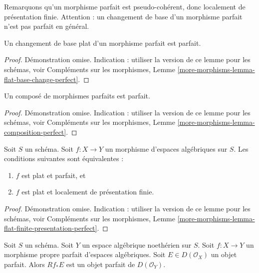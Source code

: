 \noindent
Remarquons qu'un morphisme parfait est pseudo-cohérent, donc localement de
présentation finie. Attention : un changement de base d'un morphisme parfait n'est pas parfait
en général.

\begin{lemma}
\label{lemma-flat-base-change-perfect}
Un changement de base plat d'un morphisme parfait est parfait.
\end{lemma}

\begin{proof}
Démonstration omise. Indication : utiliser la version de ce lemme pour les schémas, voir
Compléments sur les morphismes,
Lemme \ref{more-morphisms-lemma-flat-base-change-perfect}.
\end{proof}

\begin{lemma}
\label{lemma-composition-perfect}
Un composé de morphismes parfaits est parfait.
\end{lemma}

\begin{proof}
Démonstration omise. Indication : utiliser la version de ce lemme pour les schémas, voir
Compléments sur les morphismes,
Lemme \ref{more-morphisms-lemma-composition-perfect}.
\end{proof}

\begin{lemma}
\label{lemma-flat-finite-presentation-perfect}
Soit $S$ un schéma. Soit $f : X \to Y$ un morphisme d'espaces algébriques sur
$S$. Les conditions suivantes sont équivalentes :
\begin{enumerate}
\item $f$ est plat et parfait, et
\item $f$ est plat et localement de présentation finie.
\end{enumerate}
\end{lemma}

\begin{proof}
Démonstration omise. Indication : utiliser la version de ce lemme pour les schémas, voir
Compléments sur les morphismes,
Lemme \ref{more-morphisms-lemma-flat-finite-presentation-perfect}.
\end{proof}

\begin{lemma}
\label{lemma-perfect-proper-perfect-direct-image}
Soit $S$ un schéma. Soit $Y$ un espace algébrique noethérien sur $S$.
Soit $f : X \to Y$ un morphisme propre parfait d'espaces algébriques.
Soit $E \in D(\mathcal{O}_X)$ un objet parfait. Alors
$Rf_*E$ est un objet parfait de $D(\mathcal{O}_Y)$.
\end{lemma}

